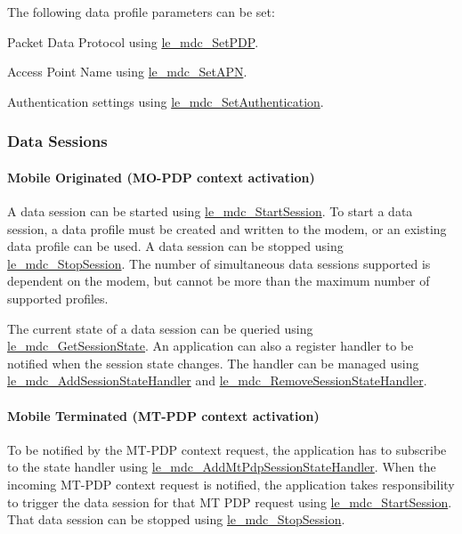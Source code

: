 The following data profile parameters can be set\+:
\begin{DoxyItemize}
\item Packet Data Protocol using \hyperlink{le__mdc__interface_8h_a73e66a7a63dc95d7f261fc2a26470386}{le\+\_\+mdc\+\_\+\+Set\+P\+D\+P}.
\item Access Point Name using \hyperlink{le__mdc__interface_8h_a1777f22b1a400593c3e0fb879acd57c6}{le\+\_\+mdc\+\_\+\+Set\+A\+P\+N}.
\item Authentication settings using \hyperlink{le__mdc__interface_8h_abf58f1dd7d4f9b915647e9c0f642065b}{le\+\_\+mdc\+\_\+\+Set\+Authentication}.
\end{DoxyItemize}\hypertarget{c_mdc_le_mdc_session}{}\subsubsection{Data Sessions}\label{c_mdc_le_mdc_session}
\hypertarget{c_mdc_le_mdc_session_MO}{}\paragraph{Mobile Originated (\+M\+O-\/\+P\+D\+P context activation)}\label{c_mdc_le_mdc_session_MO}
A data session can be started using \hyperlink{le__mdc__interface_8h_a2cb08d5c3e6c43297d80448891719649}{le\+\_\+mdc\+\_\+\+Start\+Session}. To start a data session, a data profile must be created and written to the modem, or an existing data profile can be used. A data session can be stopped using \hyperlink{le__mdc__interface_8h_a53453f85065c3cace0922150b7e3d869}{le\+\_\+mdc\+\_\+\+Stop\+Session}. The number of simultaneous data sessions supported is dependent on the modem, but cannot be more than the maximum number of supported profiles.

The current state of a data session can be queried using \hyperlink{le__mdc__interface_8h_add91c364e8b3e4e82a0ce64e480c016b}{le\+\_\+mdc\+\_\+\+Get\+Session\+State}. An application can also a register handler to be notified when the session state changes. The handler can be managed using \hyperlink{le__mdc__interface_8h_a594c85c1ccb56ddfbaf36496f35f681e}{le\+\_\+mdc\+\_\+\+Add\+Session\+State\+Handler} and \hyperlink{le__mdc__interface_8h_a3b89962f4383f42a357f5a5fcc14fdff}{le\+\_\+mdc\+\_\+\+Remove\+Session\+State\+Handler}.\hypertarget{c_mdc_le_mdc_session_MT}{}\paragraph{Mobile Terminated (\+M\+T-\/\+P\+D\+P context activation)}\label{c_mdc_le_mdc_session_MT}
To be notified by the M\+T-\/\+P\+D\+P context request, the application has to subscribe to the state handler using \hyperlink{le__mdc__interface_8h_ada19c2a399ba8c0aa038e27c21689472}{le\+\_\+mdc\+\_\+\+Add\+Mt\+Pdp\+Session\+State\+Handler}. When the incoming M\+T-\/\+P\+D\+P context request is notified, the application takes responsibility to trigger the data session for that M\+T P\+D\+P request using \hyperlink{le__mdc__interface_8h_a2cb08d5c3e6c43297d80448891719649}{le\+\_\+mdc\+\_\+\+Start\+Session}. That data session can be stopped using \hyperlink{le__mdc__interface_8h_a53453f85065c3cace0922150b7e3d869}{le\+\_\+mdc\+\_\+\+Stop\+Session}.

